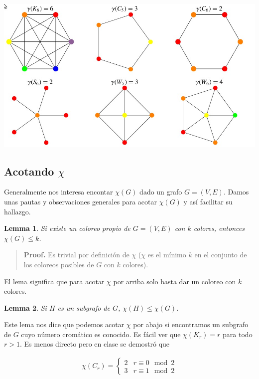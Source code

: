 \documentclass[a4paper, 12pt]{article}
\newtheorem{lemma}{Lemma}
\newtheorem{lemma}{Lemma}
\begin{document}
\begin{center}
\includegraphics[scale=0.35]{coloring}
\end{center}

\subsection{Acotando $\chi$}

Generalmente nos interesa encontar $\chi(G)$ dado un grafo $G = (V, E) $. Damos
unas pautas y observaciones generales para acotar $\chi(G)$ y así facilitar su
hallazgo.

\begin{lemma}
    Si existe un coloreo propio de $G = (V, E)$ con $k$ colores, entonces
    $\chi(G) \leq k$.
\end{lemma}


\small
\begin{quote}

\textbf{Proof.} Es trivial por definición de $\chi$ ($\chi$ es el mínimo $k$ en
el conjunto de los coloreos posibles de $G$ con $k$ colores).

\end{quote}
\normalsize

El lema significa que para acotar $\chi$ por arriba solo basta dar un coloreo
con $k$ colores.

\begin{lemma}
    Si $H$ es un subgrafo de $G$, $\chi(H) \leq \chi(G)$.
\end{lemma}

Este lema nos dice que podemos acotar $\chi$ por abajo si encontramos un
subgrafo de $G$ cuyo número cromático es conocido. Es fácil ver que $\chi(K_r) =
r$ para todo $r > 1$. Es menos directo pero en clase se demostró que

\begin{align*}
    \chi(C_r) = \begin{cases}
        2 & r \equiv 0 \mod 2  \\ 
        3 & r \equiv 1 \mod 2 
    \end{cases}
\end{align*}
\end{document}
